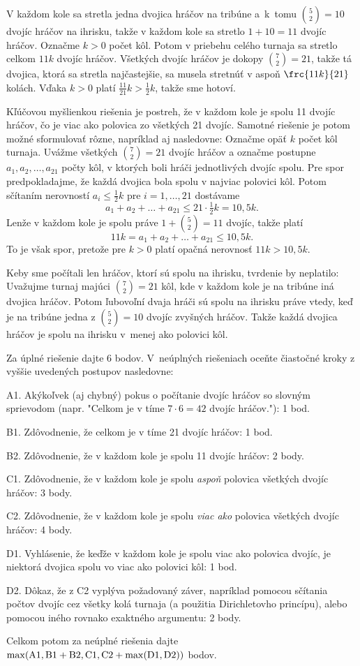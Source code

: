 {%
V každom kole sa stretla jedna dvojica hráčov na tribúne a~k~tomu ${5\choose 2}=10$ dvojíc hráčov na ihrisku, takže v každom kole sa stretlo $1+10=11$ dvojíc hráčov.
Označme $k>0$ počet kôl. Potom v priebehu celého turnaja sa stretlo celkom $11k$ dvojíc hráčov.
Všetkých dvojíc hráčov je dokopy ${7\choose 2}=21$, takže tá dvojica, ktorá sa stretla najčastejšie, sa musela stretnúť v aspoň $\frc{11k}{21}$ kolách. Vďaka $k>0$ platí $\frac{11}{21}k>\frac12 k$, takže sme hotoví.

\poznamka
Kľúčovou myšlienkou riešenia je postreh, že v každom kole je spolu 11 dvojíc hráčov, čo je viac ako polovica zo všetkých 21 dvojíc. Samotné riešenie je potom možné sformulovať rôzne, napríklad aj nasledovne:
Označme opäť $k$ počet kôl turnaja.
Uvážme všetkých ${{7 \choose 2}=21}$ dvojíc hráčov a označme postupne $a_1,a_2,\ldots,a_{21}$ počty kôl, v ktorých boli hráči jednotlivých dvojíc spolu.
Pre spor predpokladajme, že každá dvojica bola spolu v najviac polovici kôl.
Potom sčítaním nerovností $a_i\le \frac 12 k$ pre $i=1,\ldots,21$ dostávame $$a_1+a_2+\ldots+a_{21}\le 21\cdot \tfrac 12 k=10{,}5k.$$
Lenže v každom kole je spolu práve $1+{5\choose 2}=11$ dvojíc, takže platí $$11k=a_1+a_2+\ldots+a_{21}\le 10{,}5k.$$ To je však spor, pretože pre $k>0$ platí opačná nerovnosť $11k>10{,}5k$.

\poznamka
Keby sme počítali len hráčov, ktorí sú spolu na ihrisku, tvrdenie by neplatilo: Uvažujme turnaj majúci ${7 \choose 2}=21$ kôl, kde v každom kole je na tribúne iná dvojica hráčov. Potom ľubovoľní dvaja hráči sú spolu na ihrisku práve vtedy, keď je na tribúne jedna z ${5 \choose 2}=10$ dvojíc zvyšných hráčov. Takže každá dvojica hráčov je spolu na ihrisku v~menej ako polovici kôl.


\schemaABC
Za úplné riešenie dajte 6 bodov. V~neúplných riešeniach oceňte čiastočné kroky z vyššie uvedených postupov nasledovne:

\smallskip
\item{A1.} Akýkoľvek (aj chybný) pokus o počítanie dvojíc hráčov so slovným sprievodom (napr. "Celkom je v tíme $7\cdot 6=42$ dvojíc hráčov."): 1 bod.
\item{B1.} Zdôvodnenie, že celkom je v tíme 21 dvojíc hráčov: 1 bod.
\item{B2.} Zdôvodnenie, že v každom kole je spolu 11 dvojíc hráčov: 2 body.
\item{C1.} Zdôvodnenie, že v každom kole je spolu {\it aspoň} polovica všetkých dvojíc hráčov: 3 body.
\item{C2.} Zdôvodnenie, že v každom kole je spolu {\it viac ako} polovica všetkých dvojíc hráčov: 4 body.
\item{D1.} Vyhlásenie, že keďže v každom kole je spolu viac ako polovica dvojíc, je niektorá dvojica spolu vo viac ako polovici kôl: 1 bod.
\item{D2.} Dôkaz, že z C2 vyplýva požadovaný záver, napríklad pomocou sčítania počtov dvojíc cez všetky kolá turnaja (a použitia Dirichletovho princípu), alebo pomocou iného rovnako exaktného argumentu: 2 body.

\smallskip\noindent
Celkom potom za neúplné riešenia dajte $\rm\max(A1,B1+B2,C1,C2+\max(D1,D2))$ bodov.
\endschema
}

